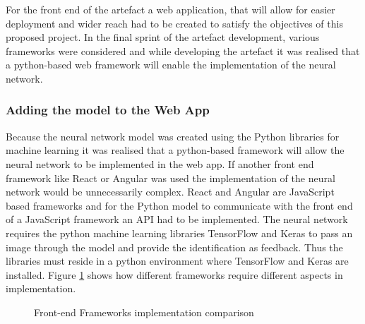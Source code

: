 For the front end of the artefact a web application, that will allow for easier deployment and wider reach had to be created to satisfy the objectives of this proposed project. In the final sprint of the artefact development, various frameworks were considered and while developing the artefact it was realised that a python-based web framework will enable the implementation of the neural network. 

\subsubsection{Adding the model to the Web App}

Because the neural network model was created using the Python libraries for machine learning it was realised that a python-based framework will allow the neural network to be implemented in the web app. If another front end framework like React or Angular was used the implementation of the neural network would be unnecessarily complex. React and Angular are JavaScript based frameworks and for the Python model to communicate with the front end of a JavaScript framework an API had to be implemented. The neural network requires the python machine learning libraries TensorFlow and Keras to pass an image through the model and provide the identification as feedback. Thus the libraries must reside in a python environment where TensorFlow and Keras are installed. Figure \ref{fig:lay} shows how different frameworks require different aspects in implementation. 

\begin{figure}[H]%
\centering
{}%
\caption{Front-end Frameworks implementation comparison}%
\label{fig:lay}%
\end{figure}

